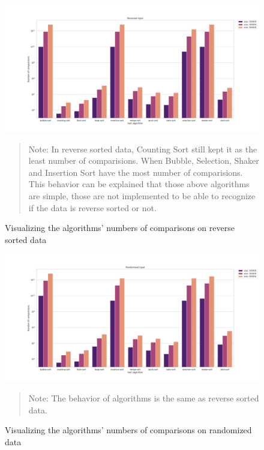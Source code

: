 \documentclass[11pt,a4paper]{article}
\newenvironment{fignote}{\begin{quote}\footnotesize}{\end{quote}}
\begin{document}
\begin{figure}[H]
  \includegraphics[width = 16cm]{plot/rev_bar.png}
  \centering
  \begin{fignote} 
    Note: In reverse sorted data, Counting Sort still kept it as the least number of comparisions.
    When Bubble, Selection, Shaker and Insertion Sort have the most number of comparisions.
    This behavior can be explained that those above algorithms are simple, those are not implemented to be able to recognize if the data is reverse sorted or not.
  \end{fignote}
  \caption{Visualizing the algorithms' numbers of comparisons on reverse sorted data}
\end{figure}

\begin{figure}[H]
  \includegraphics[width = 16cm]{plot/rand_bar.png}
  \centering
  \begin{fignote} 
    Note: The behavior of algorithms is the same as reverse sorted data.
  \end{fignote}
  \caption{Visualizing the algorithms' numbers of comparisons on randomized data}
\end{figure}
\end{document}
